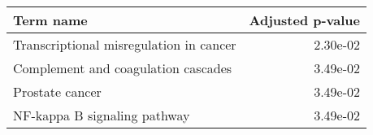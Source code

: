 \begin{tabular}{lr}
\toprule
                               Term name &  Adjusted p-value \\
\midrule
 Transcriptional misregulation in cancer &          2.30e-02 \\
     Complement and coagulation cascades &          3.49e-02 \\
                         Prostate cancer &          3.49e-02 \\
            NF-kappa B signaling pathway &          3.49e-02 \\
\bottomrule
\end{tabular}
